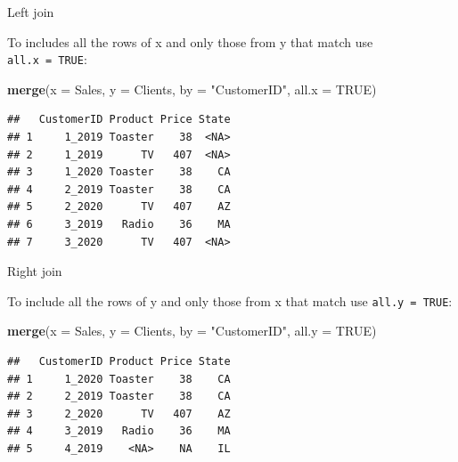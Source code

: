 \documentclass[ignorenonframetext,]{beamer}
\newenvironment{Shaded}{\begin{snugshade}}{\end{snugshade}}
\newcommand{\DataTypeTok}[1]{\textcolor[rgb]{0.13,0.29,0.53}{#1}}
\newcommand{\KeywordTok}[1]{\textcolor[rgb]{0.13,0.29,0.53}{\textbf{#1}}}
\newcommand{\NormalTok}[1]{#1}
\newcommand{\OtherTok}[1]{\textcolor[rgb]{0.56,0.35,0.01}{#1}}
\newcommand{\StringTok}[1]{\textcolor[rgb]{0.31,0.60,0.02}{#1}}
\begin{document}
\begin{frame}[fragile]{Left join}
\protect\hypertarget{left-join}{}

To includes all the rows of x and only those from y that match use
\texttt{all.x\ =\ TRUE}:

\begin{Shaded}
\begin{Highlighting}[]
\KeywordTok{merge}\NormalTok{(}\DataTypeTok{x =}\NormalTok{ Sales, }\DataTypeTok{y =}\NormalTok{ Clients,}
  \DataTypeTok{by =} \StringTok{"CustomerID"}\NormalTok{, }
  \DataTypeTok{all.x =} \OtherTok{TRUE}\NormalTok{) }
\end{Highlighting}
\end{Shaded}

\begin{verbatim}
##   CustomerID Product Price State
## 1     1_2019 Toaster    38  <NA>
## 2     1_2019      TV   407  <NA>
## 3     1_2020 Toaster    38    CA
## 4     2_2019 Toaster    38    CA
## 5     2_2020      TV   407    AZ
## 6     3_2019   Radio    36    MA
## 7     3_2020      TV   407  <NA>
\end{verbatim}

\end{frame}

\begin{frame}[fragile]{Right join}
\protect\hypertarget{right-join}{}

To include all the rows of y and only those from x that match use
\texttt{all.y\ =\ TRUE}:

\begin{Shaded}
\begin{Highlighting}[]
\KeywordTok{merge}\NormalTok{(}\DataTypeTok{x =}\NormalTok{ Sales, }\DataTypeTok{y =}\NormalTok{ Clients,}
  \DataTypeTok{by =} \StringTok{"CustomerID"}\NormalTok{, }
  \DataTypeTok{all.y =} \OtherTok{TRUE}\NormalTok{) }
\end{Highlighting}
\end{Shaded}

\begin{verbatim}
##   CustomerID Product Price State
## 1     1_2020 Toaster    38    CA
## 2     2_2019 Toaster    38    CA
## 3     2_2020      TV   407    AZ
## 4     3_2019   Radio    36    MA
## 5     4_2019    <NA>    NA    IL
\end{verbatim}

\end{frame}
\end{document}
